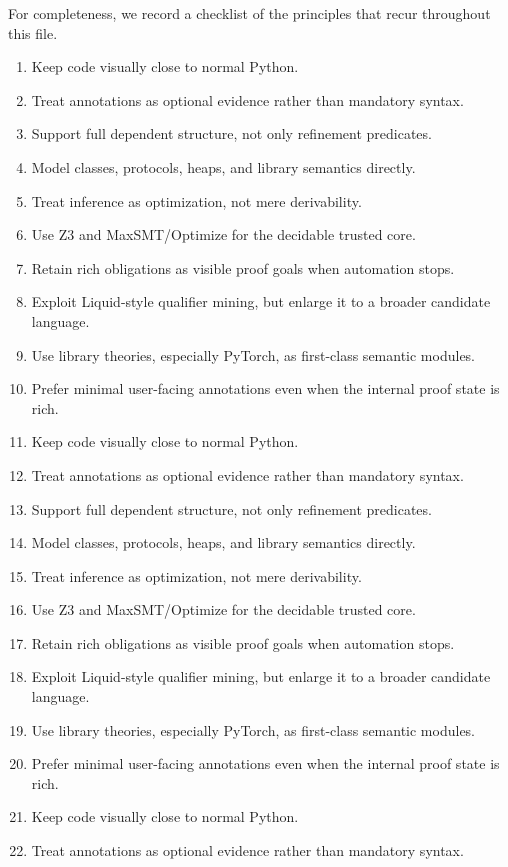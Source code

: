 \documentclass[11pt]{article}
\newcommand{\Zthree}{\textsc{Z3}}
\theoremstyle{definition}
\theoremstyle{plain}
\begin{document}
For completeness, we record a checklist of the principles that recur throughout this file.
\begin{enumerate}[label=\arabic*.]
  \item Keep code visually close to normal Python.
  \item Treat annotations as optional evidence rather than mandatory syntax.
  \item Support full dependent structure, not only refinement predicates.
  \item Model classes, protocols, heaps, and library semantics directly.
  \item Treat inference as optimization, not mere derivability.
  \item Use \Zthree{} and MaxSMT/Optimize for the decidable trusted core.
  \item Retain rich obligations as visible proof goals when automation stops.
  \item Exploit Liquid-style qualifier mining, but enlarge it to a broader candidate language.
  \item Use library theories, especially PyTorch, as first-class semantic modules.
  \item Prefer minimal user-facing annotations even when the internal proof state is rich.
  \item Keep code visually close to normal Python.
  \item Treat annotations as optional evidence rather than mandatory syntax.
  \item Support full dependent structure, not only refinement predicates.
  \item Model classes, protocols, heaps, and library semantics directly.
  \item Treat inference as optimization, not mere derivability.
  \item Use \Zthree{} and MaxSMT/Optimize for the decidable trusted core.
  \item Retain rich obligations as visible proof goals when automation stops.
  \item Exploit Liquid-style qualifier mining, but enlarge it to a broader candidate language.
  \item Use library theories, especially PyTorch, as first-class semantic modules.
  \item Prefer minimal user-facing annotations even when the internal proof state is rich.
  \item Keep code visually close to normal Python.
  \item Treat annotations as optional evidence rather than mandatory syntax.

\end{enumerate}
\end{document}
